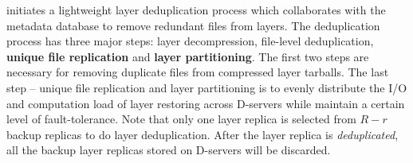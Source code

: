  \sysname initiates a lightweight layer deduplication process which collaborates with the metadata database
 to remove redundant files from layers. 
The deduplication process has three major steps: 
layer decompression, 
file-level deduplication,
\textbf{unique file replication} and \textbf{layer partitioning}. 
The first two steps are necessary for removing duplicate files from compressed layer tarballs.
The last step -- unique file replication and layer partitioning is 
to evenly distribute the I/O and computation load of layer restoring across D-servers 
while maintain a certain level of fault-tolerance.  
Note that only one layer replica is selected from $R-r$ backup replicas to do layer deduplication.
After the layer replica is \emph{deduplicated}, all the backup layer replicas stored on D-servers will be discarded.  



%
